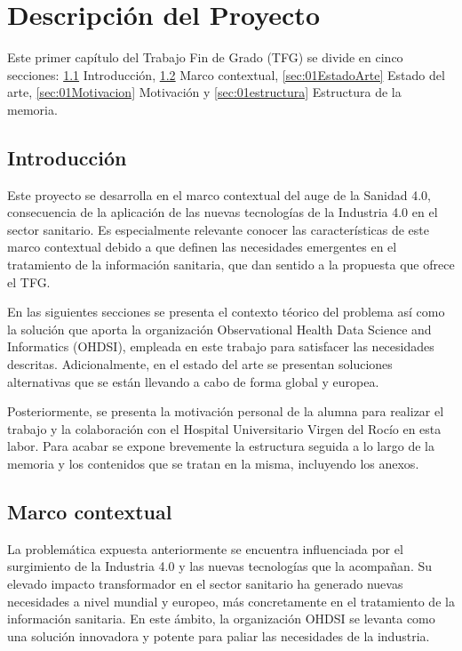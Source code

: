 \chapter{Descripción del Proyecto}\label{cap:01introduccion}

Este primer capítulo del Trabajo Fin de Grado (TFG) se divide en cinco secciones: \ref{sec:01intro} Introducción, \ref{sec:01Contexto} Marco contextual, \ref{sec:01EstadoArte} Estado del arte, \ref{sec:01Motivacion} Motivación y \ref{sec:01estructura} Estructura de la memoria.

\section{Introducción} \label{sec:01intro}

Este proyecto se desarrolla en el marco contextual del auge de la Sanidad 4.0, consecuencia de la aplicación de las nuevas tecnologías de la Industria 4.0 en el sector sanitario. Es especialmente relevante conocer las características de este marco contextual debido a que definen las necesidades emergentes en el tratamiento de la información sanitaria, que dan sentido a la propuesta que ofrece el TFG.

En las siguientes secciones se presenta el contexto téorico del problema así como la solución que aporta la organización Observational Health Data Science and Informatics (OHDSI), empleada en este trabajo para satisfacer las necesidades descritas. Adicionalmente, en el estado del arte se presentan soluciones alternativas que se están llevando a cabo de forma global y europea.

Posteriormente, se presenta la motivación personal de la alumna para realizar el trabajo y la colaboración con el Hospital Universitario Virgen del Rocío en esta labor. Para acabar se expone brevemente la estructura seguida a lo largo de la memoria y los contenidos que se tratan en la misma, incluyendo los anexos.


\section{Marco contextual} \label{sec:01Contexto} 

La problemática expuesta anteriormente se encuentra influenciada por el surgimiento de la Industria 4.0 y las nuevas tecnologías que la acompañan. Su elevado impacto transformador en el sector sanitario ha generado nuevas necesidades a nivel mundial y europeo, más concretamente en el tratamiento de la información sanitaria. En este ámbito, la organización OHDSI se levanta como una solución innovadora y potente para paliar las necesidades de la industria.


